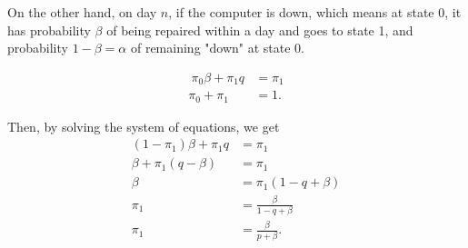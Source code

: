 \documentclass{article}
\begin{document}
On the other hand, on day $n$, if the computer is down, which means at state 0, it has probability $\beta$ of being repaired within a day and goes to state 1, and probability $1-\beta = \alpha$ of remaining "down" at state 0.

\begin{align*}\
    \pi_0\beta + \pi_1q & = \pi_1 \\
    \pi_0 + \pi_1 & = 1.
\end{align*}

Then, by solving the system of equations, we get 
\begin{align*}
    (1-\pi_1)\beta + \pi_1q & = \pi_1 \\
    \beta + \pi_1(q-\beta) & = \pi_1 \\
    \beta & = \pi_1(1-q+\beta) \\
    \pi_1 & = \frac{\beta}{1-q+\beta} \\
    \pi_1 & = \frac{\beta}{p+\beta}.
\end{align*}
\bigbreak
\end{document}
